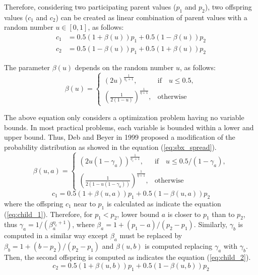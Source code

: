 Therefore, considering two participating parent values ($p_1$ and $p_2$), two offspring values ($c_1$ and $c_2$) can be created as linear combination of parent values with a random number $u \in [0, 1]$, as follows:
\begin{equation} 
\begin{split}
c_1 &= 0.5(1 + \beta(u))p_1 + 0.5(1 - \beta(u)) p_2 \\
c_2 &= 0.5(1 - \beta(u))p_1 + 0.5(1 + \beta(u)) p_2
\end{split}
\end{equation}

The parameter $\beta(u)$ depends on the random number $u$, as follows:
\begin{equation}
    \beta(u)= 
\begin{cases}
     (2u)^{\frac{1}{\eta_c+1}},& \text{if} \quad u \leq 0.5,\\
     	(\frac{1}{2(1-u)})^{\frac{1}{\eta+1}} ,& \text{otherwise}
\end{cases}
\end{equation}

The above equation only considers a optimization problem having no variable bounds.
%
In most practical problems, each variable is bounded within a lower and upper bound.
%
Thus, Deb and Beyer in 1999 proposed a modification of the probability distribution as showed in the equation (\ref{eq:sbx_spread}).
%
\begin{equation} \label{eq:sbx_spread}
    \beta(u, a)= 
\begin{cases}
     (2u(1-\gamma_a))^{\frac{1}{\eta_c+1}},& \text{if} \quad u \leq 0.5/(1-\gamma_a),\\
     	(\frac{1}{2(1-u(1-\gamma_a))})^{\frac{1}{\eta+1}} ,& \text{otherwise}
\end{cases}
\end{equation}
\begin{equation} \label{eq:child_1}
c_1 = 0.5(1 + \beta(u,a))p_1 + 0.5(1-\beta(u,a))p_2
\end{equation}
where the offspring $c_1$ near to $p_1$ is calculated as indicate the equation (\ref{eq:child_1}).
%
Therefore, for $p_1 < p_2$, lower bound $a$ is closer to $p_1$ than to $p_2$, thus $\gamma_a = 1/(\beta_a^{\eta_c + 1})$, where $\beta_a = 1 + (p_1 - a) / (p_2 - p_1)$.
%
Similarly, $\gamma_b$ is computed in a similar way except $\beta_a$ must be replaced by $\beta_b = 1 + (b-p_2)/(p_2 - p_1)$ and $\beta(u,b)$ is computed replacing $\gamma_a$ with $\gamma_b$.
%
Then, the second offspring is computed as indicates the equation (\ref{eq:child_2}).
\begin{equation} \label{eq:child_2}
c_2 = 0.5(1 + \beta(u,b))p_1 + 0.5(1-\beta(u,b))p_2
\end{equation}
%
%

